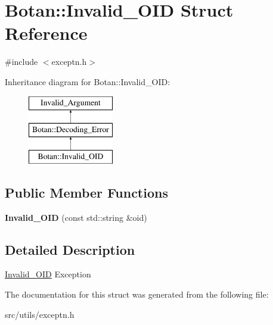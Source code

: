 \hypertarget{structBotan_1_1Invalid__OID}{\section{Botan\-:\-:Invalid\-\_\-\-O\-I\-D Struct Reference}
\label{structBotan_1_1Invalid__OID}
}


{\ttfamily \#include $<$exceptn.\-h$>$}

Inheritance diagram for Botan\-:\-:Invalid\-\_\-\-O\-I\-D\-:\begin{figure}[H]
\begin{center}
\leavevmode
\includegraphics[height=3.000000cm]{structBotan_1_1Invalid__OID}
\end{center}
\end{figure}
\subsection*{Public Member Functions}
\begin{DoxyCompactItemize}
\item 
\hypertarget{structBotan_1_1Invalid__OID_a2ac1ff140bf40e3a3484100837794899}{{\bfseries Invalid\-\_\-\-O\-I\-D} (const std\-::string \&oid)}\label{structBotan_1_1Invalid__OID_a2ac1ff140bf40e3a3484100837794899}

\end{DoxyCompactItemize}


\subsection{Detailed Description}
\hyperlink{structBotan_1_1Invalid__OID}{Invalid\-\_\-\-O\-I\-D} Exception 

The documentation for this struct was generated from the following file\-:\begin{DoxyCompactItemize}
\item 
src/utils/exceptn.\-h\end{DoxyCompactItemize}
